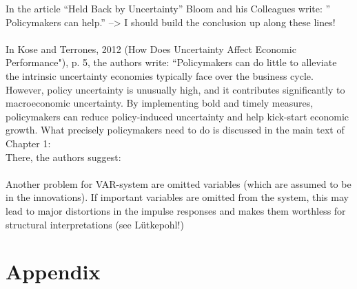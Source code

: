 \documentclass[a4paper,11pt,listof=nochaptergap,oneside,pointednumbers,bibtotoc,bigheadings,liststotoc]{scrbook}
\theoremstyle{mysatz}
\theoremstyle{mydefinition}
\theoremstyle{mybemerkung}
\begin{document}
In the article ``Held Back by Uncertainty'' Bloom and his Colleagues write: '' Policymakers can help.'' --> I should build the conclusion up along these lines! \\
\\
In Kose and Terrones, 2012 (How Does Uncertainty Affect Economic Performance"), p. 5, the authors write: ``Policymakers can do little to alleviate the intrinsic uncertainty economies typically face over the business cycle. However, policy uncertainty is unusually high, and it contributes significantly to macroeconomic uncertainty. By implementing bold and timely measures, policymakers can reduce policy-induced uncertainty and help kick-start economic growth. What precisely policymakers need to do is discussed in the main text of Chapter 1:\\
There, the authors suggest: 
\\
\\
Another problem for VAR-system are omitted variables (which are assumed to be in the innovations). If important variables are omitted from the system, this may lead to major distortions in the impulse responses and makes them worthless for structural interpretations (see Lütkepohl!)


\newpage
\appendix


\chapter{Appendix}
\label{VARAndLocalProjection}
\end{document}
